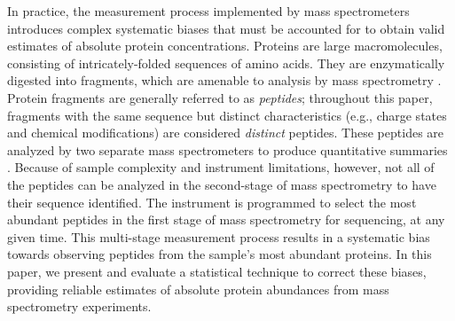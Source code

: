 In practice, the measurement process implemented by mass spectrometers introduces complex systematic biases that must be accounted for to obtain valid estimates of absolute protein concentrations.
Proteins are large macromolecules, consisting of intricately-folded sequences of amino acids. 
They are enzymatically digested into fragments, which are amenable to analysis by mass spectrometry \citep{Thakur:2011kz}. 
Protein fragments are generally referred to as {\em peptides}; throughout this paper, fragments with the same sequence but distinct characteristics (e.g., charge states and chemical modifications) are considered {\em distinct} peptides. 
These peptides are analyzed by two separate mass spectrometers to produce quantitative summaries \citep{Steen:2004tk}.
Because of sample complexity and instrument limitations, however, not all of the peptides can be analyzed in the second-stage of mass spectrometry to have their sequence identified.
The instrument is programmed to select the most abundant peptides in the first stage of mass spectrometry for sequencing, at any given time.
This multi-stage measurement process results in a systematic bias towards observing peptides from the sample's most abundant proteins.
In this paper, we present and evaluate a statistical technique to correct these biases, providing reliable estimates of absolute protein abundances from mass spectrometry experiments.

